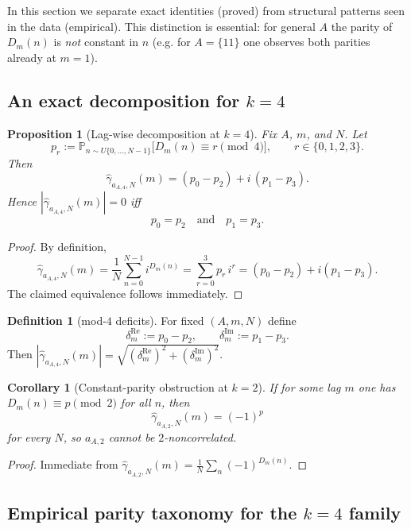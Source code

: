 \documentclass[11pt]{article}
\newtheorem{proposition}[theorem]{Proposition}
\newtheorem{corollary}[theorem]{Corollary}
\theoremstyle{definition}
\newtheorem{definition}[theorem]{Definition}
\theoremstyle{remark}
\newcommand{\Prob}{\mathbb{P}}
\begin{document}
In this section we separate exact identities (proved) from structural
patterns seen in the data (empirical).  This distinction is essential:
for general $A$ the parity of $D_m(n)$ is \emph{not} constant in $n$
(e.g. for $A=\{11\}$ one observes both parities already at $m=1$).

\subsection{An exact decomposition for $k=4$}

\begin{proposition}[Lag-wise decomposition at $k=4$]
\label{prop:deficit}
Fix $A$, $m$, and $N$.  Let
\[
  p_r := \Prob_{n\sim U\{0,\dots,N-1\}}\!\bigl[D_m(n)\equiv r \!\!\pmod 4\bigr],
  \qquad r\in\{0,1,2,3\}.
\]
Then
\[
  \hat\gamma_{a_{A,4},N}(m)
  = (p_0-p_2) + i\,(p_1-p_3).
\]
Hence $|\hat\gamma_{a_{A,4},N}(m)|=0$ iff
\[
  p_0=p_2 \quad\text{and}\quad p_1=p_3.
\]
\end{proposition}

\begin{proof}
By definition,
\[
  \hat\gamma_{a_{A,4},N}(m)
  = \frac1N\sum_{n=0}^{N-1} i^{D_m(n)}
  = \sum_{r=0}^3 p_r\, i^r
  = (p_0-p_2) + i(p_1-p_3).
\]
The claimed equivalence follows immediately.
\end{proof}

\begin{definition}[mod-$4$ deficits]
For fixed $(A,m,N)$ define
\[
  \delta_m^{\mathrm{Re}} := p_0-p_2,
  \qquad
  \delta_m^{\mathrm{Im}} := p_1-p_3.
\]
Then $|\hat\gamma_{a_{A,4},N}(m)| = \sqrt{(\delta_m^{\mathrm{Re}})^2+(\delta_m^{\mathrm{Im}})^2}$.
\end{definition}

\begin{corollary}[Constant-parity obstruction at $k=2$]
\label{cor:parity_obstruction}
If for some lag $m$ one has $D_m(n)\equiv p\pmod 2$ for all $n$, then
\[
  \hat\gamma_{a_{A,2},N}(m)=(-1)^p
\]
for every $N$, so $a_{A,2}$ cannot be $2$-noncorrelated.
\end{corollary}

\begin{proof}
Immediate from
$\hat\gamma_{a_{A,2},N}(m)=\frac1N\sum_n(-1)^{D_m(n)}$.
\end{proof}

\subsection{Empirical parity taxonomy for the $k=4$ family}
\end{document}
